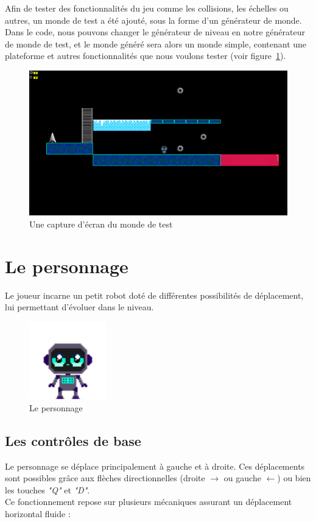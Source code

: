 \documentclass[10pt]{report}
\begin{document}
Afin de tester des fonctionnalités du jeu comme les collisions, les 
échelles ou autres, un monde de test a été ajouté, sous la forme d'un 
générateur de monde.
Dans le code, nous pouvons changer le générateur de
niveau en notre générateur de monde de test, et le monde généré sera alors
un monde simple, contenant une plateforme et autres fonctionnalités que
nous voulons tester (voir figure~\ref{fig:test_world}).

\begin{figure}[H]
  \centering
  \includegraphics[width=\textwidth]{images/test_world}
  \caption{Une capture d'écran du monde de test}
  \label{fig:test_world}
\end{figure}

\section{Le personnage}
Le joueur incarne un petit robot doté de différentes possibilités de déplacement, lui permettant d'évoluer dans le niveau.


\begin{figure}[H]
  \centering
  \includegraphics[width=0.3\textwidth]{images/character_placeholder}
  \caption{Le personnage}
\end{figure}

\subsection{Les contrôles de base}
Le personnage se déplace principalement à gauche et à droite. Ces déplacements sont possibles grâce aux flèches directionnelles (droite $\rightarrow$ ou gauche $\leftarrow$) ou bien les touches \emph{"Q"} et \emph{"D"}.\\
Ce fonctionnement repose sur plusieurs mécaniques assurant un déplacement horizontal fluide :
\end{document}
